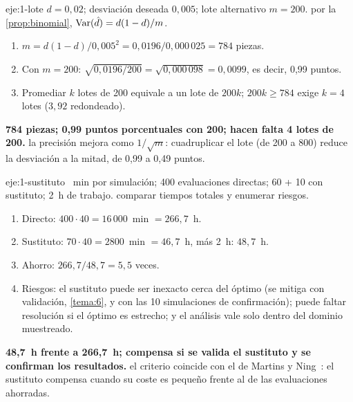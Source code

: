 \begin{solucion}{eje:1-lote}
\datos $d=0{,}02$; desviación deseada $0{,}005$; lote alternativo $m=200$.
\planteamiento por la \cref{prop:binomial}, $\operatorname{Var}(\hat d)=d(1-d)/m$.
\pasos
\begin{enumerate}[label=\arabic*.]
  \item $m=d(1-d)/0{,}005^2=0{,}0196/0{,}000\,025=784$ piezas.
  \item Con $m=200$: $\sqrt{0{,}0196/200}=\sqrt{0{,}000\,098}=0{,}0099$, es decir, 0,99 puntos.
  \item Promediar $k$ lotes de 200 equivale a un lote de $200k$; $200k\ge784$ exige $k=4$ lotes ($3{,}92$ redondeado).
\end{enumerate}
\resultado \textbf{784 piezas; 0,99 puntos porcentuales con 200; hacen falta 4 lotes de 200.}
\comprobacion la precisión mejora como $1/\sqrt m$: cuadruplicar el lote (de 200 a 800) reduce la desviación a la mitad, de 0,99 a 0,49 puntos.
\end{solucion}

\begin{solucion}{eje:1-sustituto}
~min por simulación; 400 evaluaciones directas; 60 + 10 con sustituto; 2~h de trabajo.
\planteamiento comparar tiempos totales y enumerar riesgos.
\pasos
\begin{enumerate}[label=\arabic*.]
  \item Directo: $400\cdot40=16\,000$~min $=266{,}7$~h.
  \item Sustituto: $70\cdot40=2800$~min $=46{,}7$~h, más 2~h: $48{,}7$~h.
  \item Ahorro: $266{,}7/48{,}7=5{,}5$ veces.
  \item Riesgos: el sustituto puede ser inexacto cerca del óptimo (se mitiga con validación, \cref{tema:6}, y con las 10 simulaciones de confirmación); puede faltar resolución si el óptimo es estrecho; y el análisis vale solo dentro del dominio muestreado.
\end{enumerate}
\resultado \textbf{48,7~h frente a 266,7~h; compensa si se valida el sustituto y se confirman los resultados.}
\comprobacion el criterio coincide con el de Martins y Ning~\cite[§10.1]{mn}: el sustituto compensa cuando su coste es pequeño frente al de las evaluaciones ahorradas.
\end{solucion}

